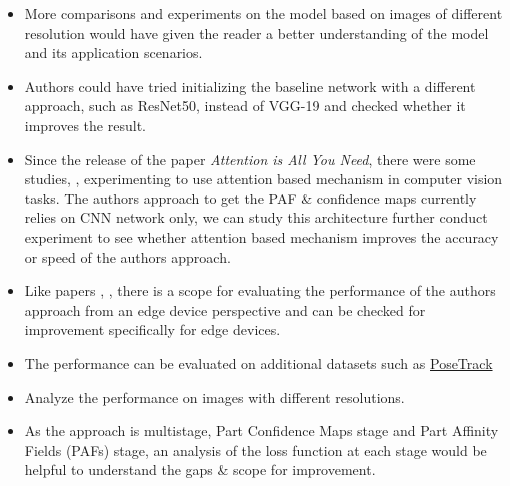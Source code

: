 \documentclass[twocolumn]{article}
\begin{document}
\begin{itemize}
	\item More comparisons and experiments on the model based on images of different resolution would have given the reader a better understanding of the model and its application scenarios.
	\item Authors could have tried initializing the baseline network with a different approach, such as ResNet50, instead of VGG-19 and checked whether it improves the result.
\end{itemize}

\begin{itemize}
	\item Since the release of the paper \emph{Attention is All You Need}\cite{Vaswani2017AttentionIA}, there were some studies, \cite{Dosovitskiy2021AnII}, experimenting to use attention based mechanism in computer vision tasks. The authors approach to get the PAF \& confidence maps currently relies on CNN network only, we can study this architecture further conduct experiment to see whether attention based mechanism improves the accuracy or speed of the authors approach.
	\item Like papers \cite{Howard2017MobileNetsEC}, \cite{Groos2021EfficientPoseSS}, there is a scope for evaluating the performance of the authors approach from an edge device perspective and can be checked for improvement specifically for edge devices.  
\end{itemize}

\begin{itemize}
	\item The performance can be evaluated on additional datasets such as \href{https://posetrack.net/}{PoseTrack}
	\item Analyze the performance on images with different resolutions.
	\item As the approach is multistage, Part Confidence Maps stage and Part Affinity Fields (PAFs) stage, an analysis of the loss function at each stage would be helpful to understand the gaps \& scope for improvement.
\end{itemize}





\end{document}
